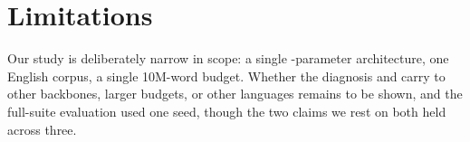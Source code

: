 \section*{Limitations}

Our study is deliberately narrow in scope: a single \rParamsM{}-parameter
architecture, one English corpus, a single 10M-word budget. Whether the
diagnosis and \MPO{} carry to other backbones, larger budgets, or other
languages remains to be shown, and the full-suite evaluation used one
seed, though the two claims we rest on both held across three.
